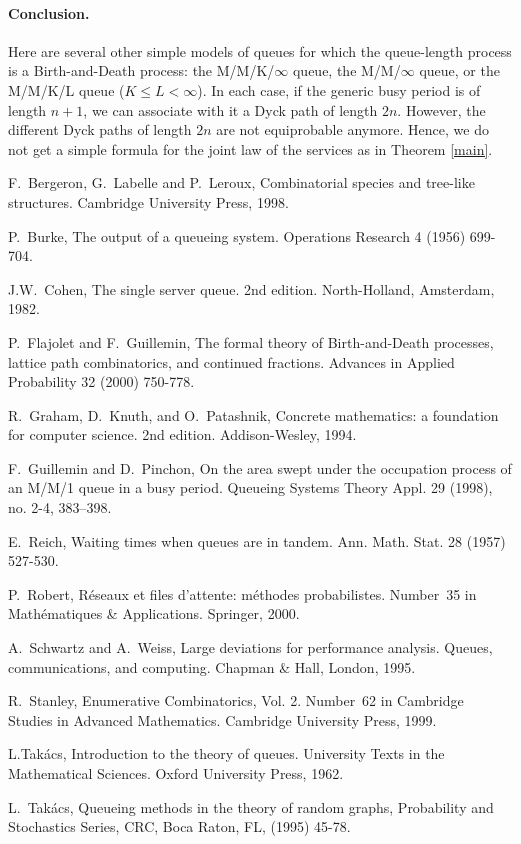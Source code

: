 \documentclass[11pt,a4paper]{article}
\numberwithin{equation}{section}
\newcommand{\1}{\mathbbm{1}}
\begin{document}
\paragraph{\bf Conclusion.}
Here are several other simple models of queues for which the queue-length process is a Birth-and-Death process: the M/M/K/$\infty$ queue,
the M/M/$\infty$ queue, or the M/M/K/L queue ($K \leq L < \infty$). In each case, if the generic busy period is of length $n+1$,
we can associate with it a Dyck path of length $2n$. However, the different Dyck paths of length $2n$ are not equiprobable anymore.
Hence, we do not get a simple formula for the joint law of the services as in Theorem \ref{main}.
\begin{thebibliography}{1}

F.~Bergeron, G.~Labelle and P.~Leroux,
\newblock Combinatorial species and tree-like structures.
\newblock Cambridge University Press, 1998.

P.~Burke,
\newblock The output of a queueing system.
\newblock Operations Research 4 (1956) 699-704.

J.W.~Cohen,
\newblock The single server queue. 2nd edition.
\newblock North-Holland, Amsterdam, 1982.


P.~Flajolet and F.~Guillemin,
\newblock The formal theory of Birth-and-Death processes, lattice path combinatorics, and continued fractions.
\newblock Advances in Applied Probability 32 (2000) 750-778.

R.~Graham, D.~Knuth, and O.~Patashnik,
\newblock Concrete mathematics: a foundation for computer science. 2nd edition.
\newblock Addison-Wesley, 1994.

F.~Guillemin and D.~Pinchon,
\newblock On the area swept under the occupation process of an M/M/1 queue in a busy period. Queueing Systems Theory
Appl. 29 (1998), no. 2-4, 383--398.

E.~Reich,
\newblock Waiting times when queues are in tandem.
\newblock Ann. Math. Stat. 28 (1957) 527-530.

P.~Robert,
\newblock R\'eseaux et files d'attente: m\'ethodes probabilistes.
\newblock Number~35 in Math\'ematiques \& Applications. Springer, 2000.

A.~Schwartz and A.~Weiss,
\newblock Large deviations for performance analysis. Queues,
  communications, and computing.
\newblock Chapman \& Hall, London, 1995.


R.~Stanley,
\newblock Enumerative Combinatorics, Vol. 2.
\newblock Number~62 in Cambridge Studies in Advanced Mathematics. Cambridge
  University Press, 1999.

L.Tak\'{a}cs,
\newblock Introduction to the theory of queues.
\newblock University Texts in the Mathematical Sciences. Oxford University
  Press, 1962.

L.~Tak\'{a}cs,
\newblock Queueing methods in the theory of random graphs,
\newblock Probability and Stochastics Series, CRC, Boca Raton, FL, (1995) 45-78.

\end{thebibliography}
\end{document}
